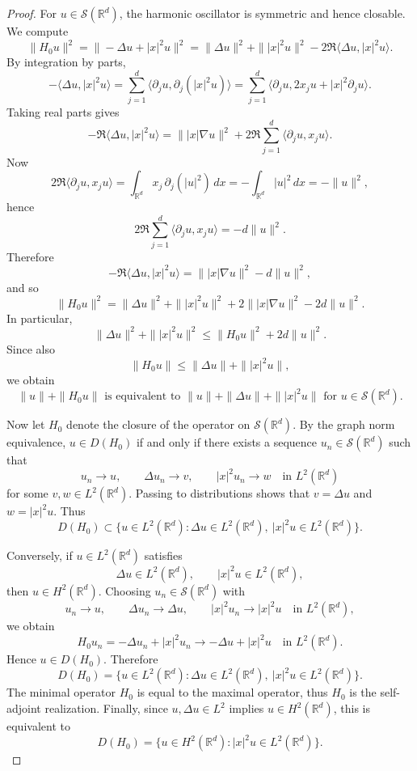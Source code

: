 \documentclass[11pt]{amsart}
\newcommand{\1}{\mathbbm{1}}
\theoremstyle{plain}
\theoremstyle{definition}
\theoremstyle{remark}
\numberwithin{equation}{section}
\begin{document}
\begin{proof}
For \(u\in \mathcal S(\mathbb R^d)\), the harmonic oscillator is symmetric and hence closable. We compute
\[
\|H_0u\|^2
=
\|-\Delta u+|x|^2u\|^2
=
\|\Delta u\|^2+\||x|^2u\|^2-2\Re\langle \Delta u, |x|^2u\rangle.
\]
By integration by parts,
\[
-\langle \Delta u, |x|^2u\rangle
=
\sum_{j=1}^d \langle \partial_j u,\partial_j(|x|^2u)\rangle
=
\sum_{j=1}^d \langle \partial_j u,2x_ju+|x|^2\partial_j u\rangle.
\]
Taking real parts gives
\[
-\Re\langle \Delta u, |x|^2u\rangle
=
\||x|\nabla u\|^2
+
2\Re\sum_{j=1}^d \langle \partial_j u,x_ju\rangle.
\]
Now
\[
2\Re\langle \partial_j u,x_ju\rangle
=
\int_{\mathbb R^d} x_j\,\partial_j(|u|^2)\,dx
=
-\int_{\mathbb R^d}|u|^2\,dx
=
-\|u\|^2,
\]
hence
\[
2\Re\sum_{j=1}^d \langle \partial_j u,x_ju\rangle
=
-d\|u\|^2.
\]
Therefore
\[
-\Re\langle \Delta u, |x|^2u\rangle
=
\||x|\nabla u\|^2-d\|u\|^2,
\]
and so
\[
\|H_0u\|^2
=
\|\Delta u\|^2+\||x|^2u\|^2+2\||x|\nabla u\|^2-2d\|u\|^2.
\]
In particular,
\[
\|\Delta u\|^2+\||x|^2u\|^2
\le
\|H_0u\|^2+2d\|u\|^2.
\]
Since also
\[
\|H_0u\|\le \|\Delta u\|+\||x|^2u\|,
\]
we obtain 
\[
\|u\|+\|H_0u\|
\text{ is equivalent to }
\|u\|+\|\Delta u\|+\||x|^2u\|
\text{ for }u\in\mathcal S(\mathbb R^d).
\]

Now let \(H_0\) denote the closure of the operator on \(\mathcal S(\mathbb R^d)\).
By the graph norm equivalence, \(u\in D(H_0)\) if and only if there exists a
sequence \(u_n\in\mathcal S(\mathbb R^d)\) such that
\[
u_n\to u,\qquad \Delta u_n\to v,\qquad |x|^2u_n\to w
\quad\text{in }L^2(\mathbb R^d)
\]
for some \(v,w\in L^2(\mathbb R^d)\). Passing to distributions shows that
\(v=\Delta u\) and \(w=|x|^2u\). Thus
\[
D(H_0)\subset
\{u\in L^2(\mathbb R^d): \Delta u\in L^2(\mathbb R^d),\ |x|^2u\in L^2(\mathbb R^d)\}.
\]

Conversely, if \(u\in L^2(\mathbb R^d)\) satisfies
\[
\Delta u\in L^2(\mathbb R^d),\qquad |x|^2u\in L^2(\mathbb R^d),
\]
then \(u\in H^2(\mathbb R^d)\). Choosing \(u_n\in \mathcal S(\mathbb R^d)\) with
\[
u_n\to u,\qquad \Delta u_n\to \Delta u,\qquad |x|^2u_n\to |x|^2u
\quad\text{in }L^2(\mathbb R^d),
\]
we obtain
\[
H_0u_n=-\Delta u_n+|x|^2u_n\to -\Delta u+|x|^2u
\quad\text{in }L^2(\mathbb R^d).
\]
Hence \(u\in D(H_0)\). Therefore
\[
D(H_0)=
\{u\in L^2(\mathbb R^d): \Delta u\in L^2(\mathbb R^d),\ |x|^2u\in L^2(\mathbb R^d)\}.
\]
The minimal operator $H_0$ is equal to the maximal operator, thus $H_0$ is the self-adjoint realization. 
Finally, since \(u,\Delta u\in L^2\) implies \(u\in H^2(\mathbb R^d)\), this is
equivalent to
\[
D(H_0)=
\{u\in H^2(\mathbb R^d): |x|^2u\in L^2(\mathbb R^d)\}.
\]

\end{proof}
\end{document}
